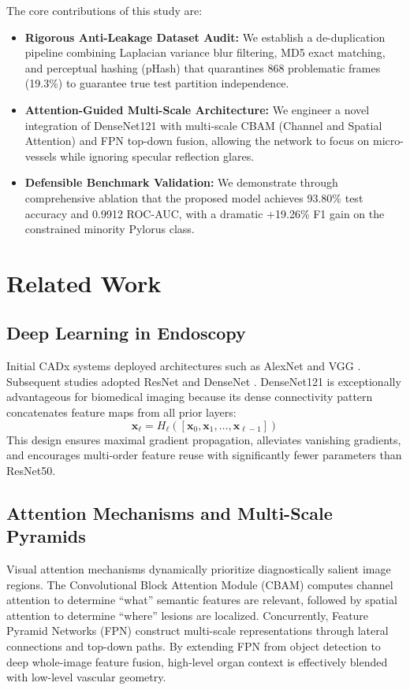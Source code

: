 \documentclass[conference]{IEEEtran}
\begin{document}
The core contributions of this study are:
\begin{itemize}
    \item \textbf{Rigorous Anti-Leakage Dataset Audit:} We establish a de-duplication pipeline combining Laplacian variance blur filtering, MD5 exact matching, and perceptual hashing (pHash) that quarantines 868 problematic frames (19.3\%) to guarantee true test partition independence.
    \item \textbf{Attention-Guided Multi-Scale Architecture:} We engineer a novel integration of DenseNet121 with multi-scale CBAM (Channel and Spatial Attention) and FPN top-down fusion, allowing the network to focus on micro-vessels while ignoring specular reflection glares.
    \item \textbf{Defensible Benchmark Validation:} We demonstrate through comprehensive ablation that the proposed model achieves 93.80\% test accuracy and 0.9912 ROC-AUC, with a dramatic +19.26\% F1 gain on the constrained minority Pylorus class.
\end{itemize}

\section{Related Work}

\subsection{Deep Learning in Endoscopy}
Initial CADx systems deployed architectures such as AlexNet and VGG \cite{b3}. Subsequent studies adopted ResNet \cite{b4} and DenseNet \cite{b5}. DenseNet121 is exceptionally advantageous for biomedical imaging because its dense connectivity pattern concatenates feature maps from all prior layers:
\begin{equation}
\mathbf{x}_\ell = H_\ell([\mathbf{x}_0, \mathbf{x}_1, \dots, \mathbf{x}_{\ell-1}])
\end{equation}
This design ensures maximal gradient propagation, alleviates vanishing gradients, and encourages multi-order feature reuse with significantly fewer parameters than ResNet50.

\subsection{Attention Mechanisms and Multi-Scale Pyramids}
Visual attention mechanisms dynamically prioritize diagnostically salient image regions. The Convolutional Block Attention Module (CBAM) \cite{b6} computes channel attention to determine ``what'' semantic features are relevant, followed by spatial attention to determine ``where'' lesions are localized. Concurrently, Feature Pyramid Networks (FPN) \cite{b7} construct multi-scale representations through lateral connections and top-down paths. By extending FPN from object detection to deep whole-image feature fusion, high-level organ context is effectively blended with low-level vascular geometry.
\end{document}
